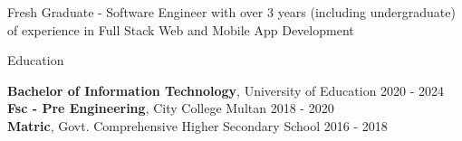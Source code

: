 \documentclass{resume} %
\begin{document}

\begin{rSection}%

{Fresh Graduate - Software Engineer with over 3 years (including undergraduate) of experience in Full Stack Web and Mobile App Development}


\end{rSection}

\begin{rSection}{Education}


{\bf Bachelor of Information Technology}, University of Education \hfill {2020 - 2024} 
\\
{\bf Fsc  - Pre Engineering}, City College Multan \hfill {2018 - 2020}
\\
{\bf Matric}, Govt. Comprehensive Higher Secondary School \hfill {2016 - 2018}


\end{rSection}
\end{document}
